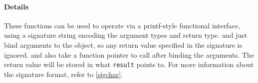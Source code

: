 \paragraph{Details}

These functions can be used to operate  via a printf-style
functional interface, using a signature string encoding the argument types and 
return type.
 and  just bind arguments to the 
object, so any return value specified in the signature is ignored. 
and  also take a function pointer to call after binding the arguments.
The return value will be stored in what \lstinline{result} points to.
For more information about the signature format, refer to \ref{sigchar}.

